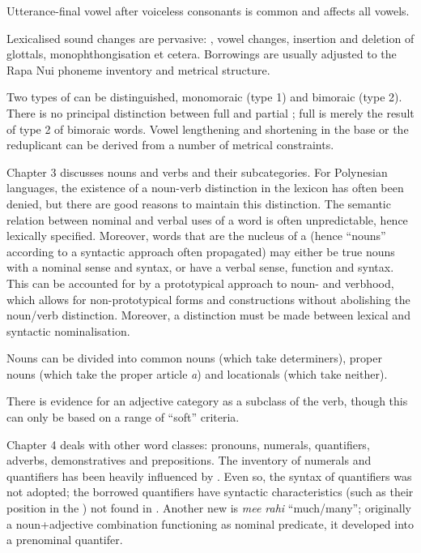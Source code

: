 Utterance-final vowel  after voiceless consonants is common and affects all vowels.

Lexicalised sound changes are pervasive: , vowel changes, insertion and deletion of glottals, monophthongisation et cetera. Borrowings are usually adjusted to the Rapa Nui phoneme inventory and metrical structure.

Two types of  can be distinguished, monomoraic (type 1) and bimoraic (type 2). There is no principal distinction between full and partial ; full  is merely the result of type 2  of bimoraic words. Vowel lengthening and shortening in the base or the reduplicant can be derived from a number of metrical constraints.

\medskip Chapter 3 discusses nouns and verbs and their subcategories. For Polynesian languages, the existence of a noun-verb distinction in the lexicon has often been denied, but there are good reasons to maintain this distinction. The semantic relation between nominal and verbal uses of a word is often unpredictable, hence lexically specified. Moreover, words that are the nucleus of a  (hence “nouns” according to a syntactic approach often propagated) may either be true nouns with a nominal sense and syntax, or have a verbal sense, function and syntax. This can be accounted for by a prototypical approach to noun- and verbhood, which allows for non-prototypical forms and constructions without abolishing the noun/verb distinction. Moreover, a distinction must be made between lexical and syntactic nominalisation.

Nouns can be divided into common nouns (which take determiners), proper nouns (which take the proper article \textit{a}) and locationals (which take neither).

There is evidence for an adjective category as a subclass of the verb, though this can only be based on a range of “soft” criteria.

\medskip Chapter 4 deals with other word classes: pronouns, numerals, quantifiers, adverbs, demonstratives and prepositions. The inventory of numerals and quantifiers has been heavily influenced by . Even so, the syntax of  quantifiers was not adopted; the borrowed quantifiers have syntactic characteristics (such as their position in the ) not found in . Another new  is \textit{me{\ꞌ}e rahi} “much/many”; originally a noun+adjective combination functioning as nominal predicate, it developed into a prenominal quantifer.

